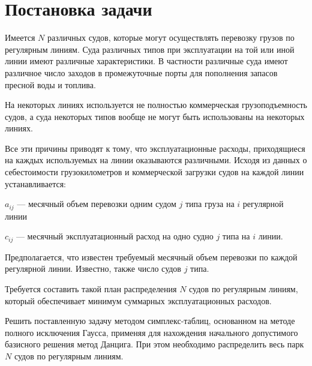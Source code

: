 \section{Постановка задачи}

Имеется $N$ различных судов, которые могут осуществлять перевозку грузов по регулярным линиям. Суда различных типов при эксплуатации на той или иной линии имеют различные характеристики. В частности различные суда имеют различное число заходов в промежуточные порты для пополнения запасов пресной воды и топлива.

На некоторых линиях используется не полностью коммерческая грузоподъемность судов, а суда некоторых типов вообще не могут быть использованы на некоторых линиях.

Все эти причины приводят к тому, что эксплуатационные расходы, приходящиеся на каждых используемых на линии оказываются различными. Исходя из данных о себестоимости грузокилометров и коммерческой загрузки судов на каждой линии устанавливается:

\begin{itemize*}
	\item $a_{ij}$ --- месячный объем перевозки одним судом $j$ типа груза на $i$ регулярной линии
	\item $c_{ij}$ --- месячный эксплуатационный расход на одно судно $j$ типа на $i$ линии.
\end{itemize*}

Предполагается, что известен требуемый месячный объем перевозки по каждой регулярной линии. Известно, также число судов $j$ типа.

Требуется составить такой план распределения $N$ судов по регулярным линиям, который обеспечивает минимум суммарных эксплуатационных расходов.

Решить поставленную задачу методом симплекс-таблиц, основанном на методе полного исключения Гаусса, применяя для нахождения начального допустимого базисного решения метод Данцига. При этом необходимо распределить весь парк $N$ судов по регулярным линиям.